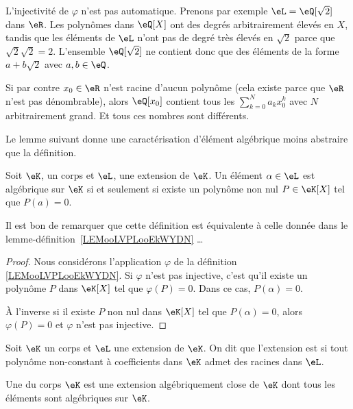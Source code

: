 \begin{example}
    L'injectivité de \( \varphi\) n'est pas automatique. Prenons par exemple \( \eL=\eQ[\sqrt{ 2 }]\) dans \( \eR\). Les polynômes dans \( \eQ[X]\) ont des degrés arbitrairement élevés en \( X\), tandis que les éléments de \( \eL\) n'ont pas de degré très élevés en \( \sqrt{ 2 }\) parce que \( \sqrt{ 2 }\sqrt{ 2 }=2\). L'ensemble \( \eQ[\sqrt{ 2 }]\) ne contient donc que des éléments de la forme \( a+b\sqrt{ 2 }\) avec \( a,b\in \eQ\).

    Si par contre \( x_0\in \eR\) n'est racine d'aucun polynôme (cela existe parce que \( \eR\) n'est pas dénombrable), alors \( \eQ[x_0]\) contient tous les \( \sum_{k=0}^Na_kx_0^k\) avec \( N\) arbitrairement grand. Et tous ces nombres sont différents.
\end{example}

Le lemme suivant donne une caractérisation d'élément algébrique moins abstraire que la définition.
\begin{lemma} 
    Soit \( \eK\), un corps et \( \eL\), une extension de \( \eK\). Un élément \( \alpha\in \eL\) est algébrique sur \( \eK\) si et seulement si existe un polynôme non nul \( P\in \eK[X]\) tel que \( P(a)=0\).
    
Il est bon de remarquer que cette définition est équivalente à celle donnée dans le lemme-définition~\ref{LEMooLVPLooEkWYDN} \dots
\end{lemma}

\begin{proof}
    Nous considérons l'application \( \varphi\) de la définition \ref{LEMooLVPLooEkWYDN}. Si \( \varphi\) n'est pas injective, c'est qu'il existe un polynôme \( P\) dans \( \eK[X]\) tel que \( \varphi(P)=0\). Dans ce cas, \( P(\alpha)=0\).

    À l'inverse si il existe \( P\) non nul dans \( \eK[X]\) tel que \( P(\alpha)=0\), alors \( \varphi(P)=0\) et \( \varphi\) n'est pas injective.
\end{proof}

\begin{definition}
    Soit \( \eK\) un corps et \( \eL \) une extension de \( \eK \). On dit que l'extension est  si tout polynôme non-constant à coefficients dans \( \eK\) admet des racines dans \( \eL \).
\end{definition}

\begin{definition}      \label{DEFooFXGUooQlnfwq}
    Une  du corps \( \eK\) est une extension algébriquement close de \( \eK\) dont tous les éléments sont algébriques sur \( \eK\).
\end{definition}

